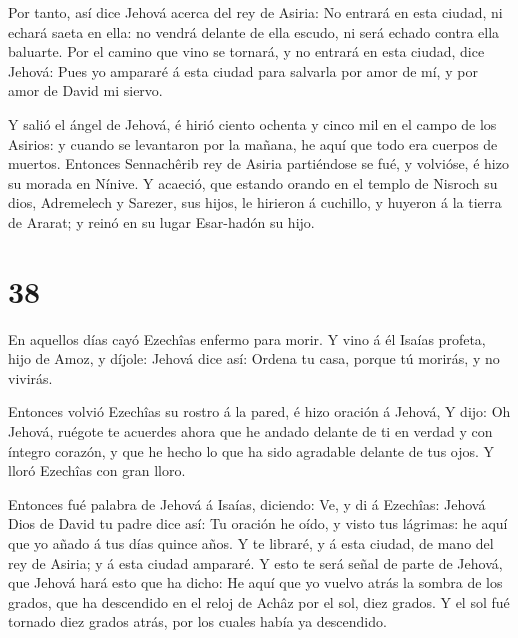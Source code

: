  Por tanto, así dice Jehová acerca del rey de Asiria: No
entrará en esta ciudad, ni echará saeta en ella: no vendrá delante de
ella escudo, ni será echado contra ella baluarte.  Por el
camino que vino se tornará, y no entrará en esta ciudad, dice Jehová:
 Pues yo ampararé á esta ciudad para salvarla por amor de
mí, y por amor de David mi siervo.

 Y salió el ángel de Jehová, é hirió ciento ochenta y cinco
mil en el campo de los Asirios: y cuando se levantaron por la mañana, he
aquí que todo era cuerpos de muertos.  Entonces Sennachêrib
rey de Asiria partiéndose se fué, y volvióse, é hizo su morada en
Nínive.  Y acaeció, que estando orando en el templo de
Nisroch su dios, Adremelech y Sarezer, sus hijos, le hirieron á
cuchillo, y huyeron á la tierra de Ararat; y reinó en su lugar
Esar-hadón su hijo.

\hypertarget{section-37}{%
\section{38}\label{section-37}}

 En aquellos días cayó Ezechîas enfermo para morir. Y vino á
él Isaías profeta, hijo de Amoz, y díjole: Jehová dice así: Ordena tu
casa, porque tú morirás, y no vivirás.

 Entonces volvió Ezechîas su rostro á la pared, é hizo
oración á Jehová,  Y dijo: Oh Jehová, ruégote te acuerdes
ahora que he andado delante de ti en verdad y con íntegro corazón, y que
he hecho lo que ha sido agradable delante de tus ojos. Y lloró Ezechîas
con gran lloro.

 Entonces fué palabra de Jehová á Isaías, diciendo:
 Ve, y di á Ezechîas: Jehová Dios de David tu padre dice
así: Tu oración he oído, y visto tus lágrimas: he aquí que yo añado á
tus días quince años.  Y te libraré, y á esta ciudad, de
mano del rey de Asiria; y á esta ciudad ampararé.  Y esto te
será señal de parte de Jehová, que Jehová hará esto que ha dicho:
 He aquí que yo vuelvo atrás la sombra de los grados, que ha
descendido en el reloj de Achâz por el sol, diez grados. Y el sol fué
tornado diez grados atrás, por los cuales había ya descendido.

